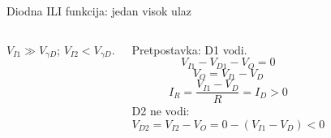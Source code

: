 \begin{frame}[label=10-s040]{Diodna ILI funkcija: jedan visok ulaz}
\setlength{\abovedisplayskip}{4pt}\setlength{\belowdisplayskip}{4pt}\setlength{\abovedisplayshortskip}{3pt}\setlength{\belowdisplayshortskip}{3pt}
\begin{columns}[T,onlytextwidth]\centering \raggedright
$V_{I1}\gg V_{\gamma D}$; $V_{I2}<V_{\gamma D}$.\par
Pretpostavka: D1 vodi.
\[V_{I1}-V_{D1}-V_O=0\]
\[V_O=V_{I1}-V_D\]
\[I_R=\frac{V_{I1}-V_D}{R}=I_D>0\]
D2 ne vodi:
\[V_{D2}=V_{I2}-V_O=0-(V_{I1}-V_D)<0\]\end{columns}
\end{frame}
